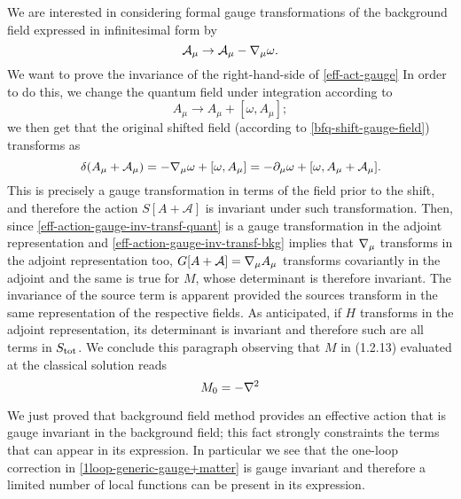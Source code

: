 We are interested in considering formal gauge transformations of the background field expressed in infinitesimal form by
\begin{equation}\label{eff-action-gauge-inv-transf-bkg}
\mathcal{A}_\mu \rightarrow \mathcal{A}_\mu -{ \mathcal{\nabla} }_\mu \omega.
\end{equation} 
We want to prove the invariance of the right-hand-side of \eqref{eff-act-gauge} 
In order to do this, we change the quantum field under integration according to 
\begin{equation}\label{eff-action-gauge-inv-transf-quant}
A_\mu \rightarrow A_\mu + [\omega, A_\mu];
\end{equation}  
we then get that the original shifted  field (according to \eqref{bfq-shift-gauge-field}) transforms as 
\begin{equation}
\delta (A_\mu +\mathcal{A}_\mu) = -{ \mathcal{\nabla} }_\mu \omega + [\omega, A_\mu] = - \partial_\mu \omega + [\omega, A_\mu + \mathcal{A}_\mu].
\end{equation}
This is precisely a gauge transformation in terms of the field prior to the shift, and therefore the action $S[A+\mathcal{A}]$ is invariant under such transformation. Then, since \eqref{eff-action-gauge-inv-transf-quant} is a gauge transformation in the adjoint representation and \eqref{eff-action-gauge-inv-transf-bkg} implies that ${ \mathcal{\nabla} }_\mu$ transforms in the adjoint representation too,  $G[A+\mathcal{A}] = { \mathcal{\nabla} }_\mu A_\mu  $ transforms covariantly in the adjoint and the same is true for $M$, whose determinant is therefore invariant. The invariance of the source term is apparent provided the sources transform in the same representation of the respective fields. As anticipated, if $H$ transforms in the adjoint representation, its determinant is invariant and therefore such are all terms in $S_{ \text{tot} }$. We conclude this paragraph observing that $M$ in (1.2.13) evaluated at the classical solution reads
\begin{equation}\label{M0}
M_0 = - { \mathcal{\nabla} }^2
\end{equation}

We just proved that background field method provides an effective action that is gauge invariant in the background field; this fact strongly constraints the terms that can appear in its expression. In particular we see that the one-loop correction in \eqref{1loop-generic-gauge+matter} is gauge invariant and therefore a limited number of local functions can be present in its expression.




